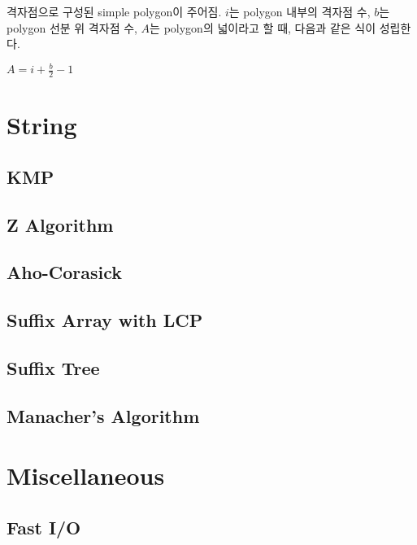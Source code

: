 \documentclass[10pt,landscape,a4paper,twocolumn]{article}
\begin{document}
격자점으로 구성된 simple polygon이 주어짐. $i$는 polygon 내부의 격자점 수, $b$는 polygon 선분 위 격자점 수, $A$는 polygon의 넓이라고 할 때, 다음과 같은 식이 성립한다.

$A = i + \frac{b}{2} - 1$

\section{String}

\subsection{KMP}


\subsection{Z Algorithm}


\subsection{Aho-Corasick}


\subsection{Suffix Array with LCP}


\subsection{Suffix Tree}

\subsection{Manacher's Algorithm}



\section{Miscellaneous}

\subsection{Fast I/O}

\end{document}
